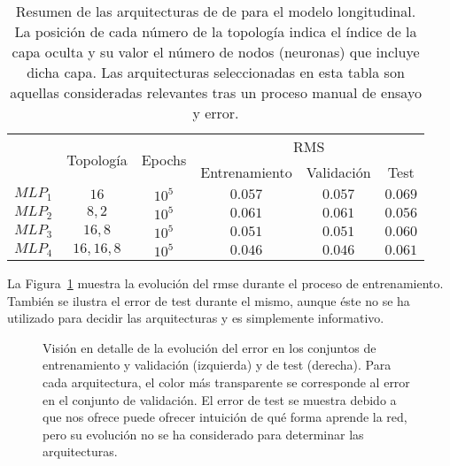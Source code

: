\begin{table}
	\centering
	\caption[Resumen de las arquitecturas de  para el modelo longitudinal]{Resumen de las arquitecturas de de  para el modelo longitudinal. La posición de cada número de la topología indica el índice de la capa oculta y su valor el número de nodos (neuronas) que incluye dicha capa. Las arquitecturas seleccionadas en esta tabla son aquellas consideradas relevantes tras un proceso manual de ensayo y error.}
	\label{tbl:cf-mlp-architectures}
	\begin{tabular}{cccccc}
		\toprule
		\multirow{2}{*}{} & \multirow{2}{*}{Topología} & \multirow{2}{*}{Epochs} & \multicolumn{3}{c}{RMS} \\
		& & & Entrenamiento & Validación & Test \\
		\midrule
		\rowcolor{black!20} $MLP_1$ & $16$        & $10^5$ & $0.057$ & $0.057$ & $0.069$  \\
		$MLP_2$ & $8, 2$      & $10^5$ & $0.061$ & $0.061$ & $0.056$  \\
		\rowcolor{black!20} $MLP_3$ & $16, 8$     & $10^5$ & $0.051$ & $0.051$ & $0.060$  \\
		$MLP_4$ & $16, 16, 8$ & $10^5$ & $0.046$ & $0.046$ & $0.061$  \\
		\bottomrule
	\end{tabular}
\end{table}

La Figura~\ref{fig:lm-mlp-rmse-all-comparisons} muestra la evolución del \gls{rmse} durante el proceso de entrenamiento. También se ilustra el error de test durante el mismo, aunque éste no se ha utilizado para decidir las arquitecturas y es simplemente informativo.

\begin{figure}[t]
	\centering
	\qquad
	\caption[Evolución del error durante el entrenamiento en las arquitecturas de \acrshort{mlp} para el modelo longitudinal]{Visión en detalle de la evolución del error en los conjuntos de entrenamiento y validación (izquierda) y de test (derecha). Para cada arquitectura, el color más transparente se corresponde al error en el conjunto de validación. El error de test se muestra debido a que nos ofrece puede ofrecer intuición de qué forma aprende la red, pero su evolución no se ha considerado para determinar las arquitecturas.}
	\label{fig:lm-mlp-rmse-all-comparisons}
\end{figure}

